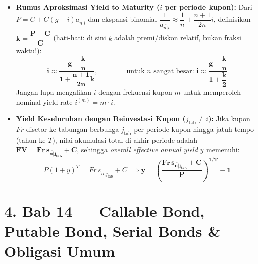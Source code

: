 \documentclass[10pt,a4paper]{article}
\newcommand{\angl}[1]{\overline{#1|}}
\begin{document}
\begin{teoremabox}
\begin{itemize}[leftmargin=1.5em, topsep=1pt, itemsep=2pt]
    \item \textbf{Rumus Aproksimasi Yield to Maturity ($i$ per periode kupon):}
    Dari $P = C + C(g - i)a_{\angl{n}i}$ dan ekspansi binomial $\dfrac{1}{a_{\angl{n}i}} \approx \dfrac{1}{n} + \dfrac{n+1}{2n}i$, definisikan $\mathbf{k = \dfrac{P - C}{C}}$ (hati-hati: di sini $k$ adalah premi/diskon relatif, bukan fraksi waktu!):
    \begin{equation*}
        \mathbf{i \approx \frac{g - \dfrac{k}{n}}{1 + \dfrac{n+1}{2n}k}}, \qquad\qquad \text{untuk } n \text{ sangat besar: } \mathbf{i \approx \frac{g - \dfrac{k}{n}}{1 + \dfrac{k}{2}}}
    \end{equation*}
    Jangan lupa mengalikan $i$ dengan frekuensi kupon $m$ untuk memperoleh nominal yield rate $i^{(m)} = m \cdot i$.
    \item \textbf{Yield Keseluruhan dengan Reinvestasi Kupon ($j_{\text{tab}} \neq i$):}
    Jika kupon $Fr$ disetor ke tabungan berbunga $j_{\text{tab}}$ per periode kupon hingga jatuh tempo (tahun ke-$T$), nilai akumulasi total di akhir periode adalah $\mathbf{FV = Fr \, s_{\angl{n}j_{\text{tab}}} + C}$, sehingga \textit{overall effective annual yield} $y$ memenuhi:
    \[
        P(1 + y)^T = Fr \, s_{\angl{n}j_{\text{tab}}} + C \implies \mathbf{y = \left(\frac{Fr \, s_{\angl{n}j_{\text{tab}}} + C}{P}\right)^{1/T} - 1}
    \]
\end{itemize}
\end{teoremabox}

\section*{\large 4. Bab 14 --- Callable Bond, Putable Bond, Serial Bonds \& Obligasi Umum}
\end{document}
